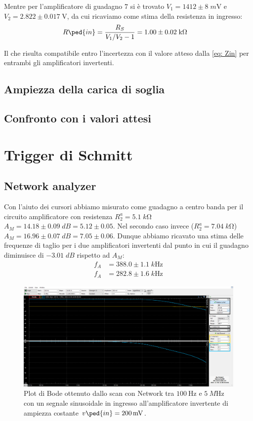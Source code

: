 \documentclass[10pt,a4paper]{article}
\begin{document}
Mentre per l'amplificatore di guadagno $7$ si è trovato
$V_1 = 1412 \pm 8 \; \si{m\V}$ e $V_2 = 2.822 \pm 0.017 \; \si{\V}$, da cui
ricaviamo come stima della resistenza in ingresso:
\begin{align*}
{R\ped{in}} &= \frac{R_S}{V_1/V_2 - 1} = 1.00 \pm 0.02 \; \si{k\ohm}
\end{align*}

Il che risulta compatibile entro l'incertezza con il valore atteso dalla
\eqref{eq: Zin} per entrambi gli amplificatori invertenti.

\subsection{Ampiezza della carica di soglia}

\subsection{Confronto con i valori attesi}

\section{Trigger di Schmitt}
\subsection{Network analyzer}
Con l'aiuto dei cursori abbiamo misurato come guadagno a centro banda
per il circuito amplificatore con resistenza $R_2^a = 5.1 \; \si{k\ohm}$
$A_M = 14.18 \pm 0.09 \; \si{dB} = 5.12 \pm 0.05$.
Nel secondo caso invece ($R_2^a = 7.04 \; \si{k\ohm}$)
$A_M = 16.96 \pm 0.07 \; \si{dB} = 7.05 \pm 0.06$.
Dunque abbiamo ricavato una stima delle frequenze di taglio per i due
amplificatori invertenti dal punto in cui il guadagno diminuisce di
$-3.01 \; \si{dB}$ rispetto ad $A_M$:
\begin{align*}
f_A &= 388.0 \pm 1.1 \; \si{k\Hz} \\
f_A &= 282.8 \pm 1.6 \; \si{k\Hz}
\end{align*}

\begin{figure}[htbp]
\centering
\includegraphics[scale=0.4]{opampbode}
\caption{Plot di Bode ottenuto dallo scan con Network tra $\SI{100}{\Hz}$ e
$\SI{5}{M\Hz}$ con un segnale sinusoidale in ingresso all'amplificatore
invertente di ampiezza costante $v\ped{in} = \SI{200}{m\V}$. \label{fig: invbode}}
\end{figure}
\end{document}
